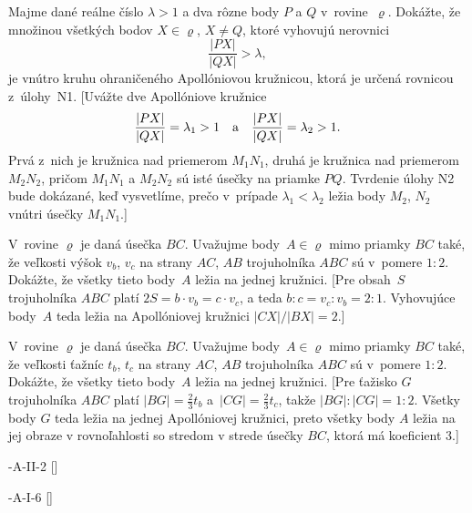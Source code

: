 {Majme dané reálne číslo $\lambda>1$ a dva rôzne body $P$ a
$Q$ v~rovine~$\varrho$. Dokážte, že množinou všetkých bodov $X\in\varrho$,
$X\ne Q$, ktoré vyhovujú nerovnici
$$
\frac{|PX|}{|QX|}>\lambda,
$$
je vnútro kruhu ohraničeného Apollóniovou kružnicou, ktorá je určená
rovnicou  z~úlohy~N1.
[Uvážte dve Apollóniove kružnice
$$
\frac{|PX|}{|QX|}=\lambda_1>1\quad\hbox{a}\quad
\frac{|PX|}{|QX|}=\lambda_2>1.
$$
Prvá z~nich je kružnica nad priemerom
$M_1N_1$, druhá je kružnica nad priemerom $M_2N_2$, pričom $M_1N_1$
a $M_2N_2$ sú isté úsečky na priamke $PQ$. Tvrdenie úlohy N2
bude dokázané, keď vysvetlíme, prečo v~prípade $\lambda_1<\lambda_2$
ležia body $M_2$, $N_2$ vnútri úsečky $M_1N_1$.]

\D
V~rovine $\varrho$ je daná úsečka $BC$. Uvažujme body~$A\in\varrho$ mimo
priamky $BC$ také, že veľkosti výšok $v_b$, $v_c$ na strany
$AC$, $AB$ trojuholníka $ABC$ sú v~pomere $1:2$. Dokážte, že všetky
tieto body~$A$ ležia na jednej kružnici.
[Pre obsah~$S$ trojuholníka $ABC$ platí $2S=b \cdot v_b = c \cdot v_c$,
a teda $b:c=v_c:v_b=2:1$. Vyhovujúce body~$A$ teda ležia na
Apollóniovej kružnici $|CX|/|BX|=2$.]

V~rovine $\varrho$ je daná úsečka $BC$. Uvažujme body~$A\in\varrho$ mimo
priamky $BC$ také, že veľkosti ťažníc $t_b$, $t_c$
na strany $AC$, $AB$ trojuholníka $ABC$ sú v~pomere $1:2$.
Dokážte, že všetky tieto body~$A$ ležia na jednej kružnici.
[Pre ťažisko $G$ trojuholníka $ABC$ platí $|BG|=\frac23t_b$
a~$|CG|=\frac23t_c$, takže $|BG|:|CG|=1:2$. Všetky body $G$ teda
ležia na jednej Apollóniovej kružnici, preto všetky body $A$ ležia
na jej obraze v rovnoľahlosti so stredom v strede úsečky
$BC$, ktorá má koeficient 3.]

-A-II-2
[]

-A-I-6
[]

}

